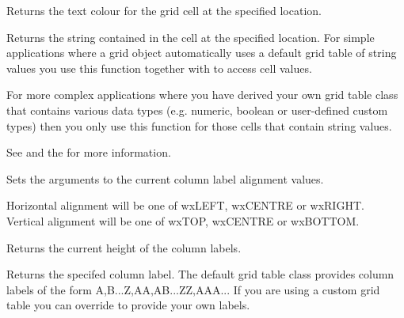 Returns the text colour for the grid cell at the specified location.

\label{wxgridgetcellvalue}



Returns the string contained in the cell at the specified location. For simple applications where a
grid object automatically uses a default grid table of string values you use this function together
with  to access cell values. 

For more complex applications where you have derived your own grid table class that contains
various data types (e.g. numeric, boolean or user-defined custom types) then you only use this
function for those cells that contain string values. 

See 
and the  for more information.

\label{wxgridgetcollabelalignment}


Sets the arguments to the current column label alignment values.

Horizontal alignment will be one of wxLEFT, wxCENTRE or wxRIGHT. \\
Vertical alignment will be one of wxTOP, wxCENTRE or wxBOTTOM.

\label{wxgridgetcollabelsize}


Returns the current height of the column labels.

\label{wxgridgetcollabelvalue}


Returns the specifed column label. The default grid table class provides column labels of
the form A,B...Z,AA,AB...ZZ,AAA...  If you are using a custom grid table you can override 
 to provide
your own labels. 

\label{wxgridgetcolsize}

